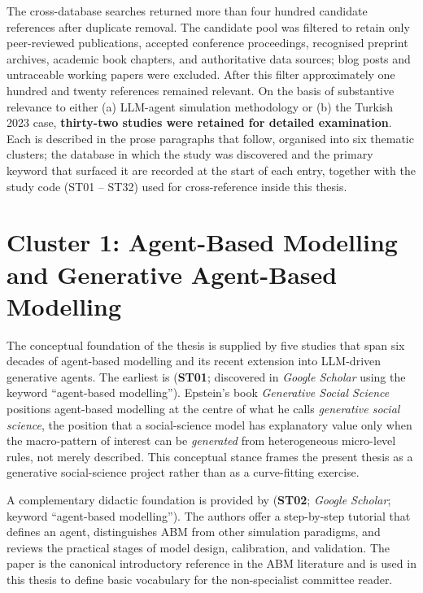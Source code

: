 \documentclass[12pt,a4paper]{report}
\begin{document}
The cross-database searches returned more than four hundred candidate references after duplicate removal. The candidate pool was filtered to retain only peer-reviewed publications, accepted conference proceedings, recognised preprint archives, academic book chapters, and authoritative data sources; blog posts and untraceable working papers were excluded. After this filter approximately one hundred and twenty references remained relevant. On the basis of substantive relevance to either (a) LLM-agent simulation methodology or (b) the Turkish 2023 case, \textbf{thirty-two studies were retained for detailed examination}. Each is described in the prose paragraphs that follow, organised into six thematic clusters; the database in which the study was discovered and the primary keyword that surfaced it are recorded at the start of each entry, together with the study code (ST01 -- ST32) used for cross-reference inside this thesis.

\section{Cluster 1: Agent-Based Modelling and Generative Agent-Based Modelling}
\label{sec:litcluster1}

The conceptual foundation of the thesis is supplied by five studies that span six decades of agent-based modelling and its recent extension into LLM-driven generative agents. The earliest is \citet{epstein2006generative} (\textbf{ST01}; discovered in \emph{Google Scholar} using the keyword \enquote{agent-based modelling}). Epstein's book \emph{Generative Social Science} positions agent-based modelling at the centre of what he calls \emph{generative social science}, the position that a social-science model has explanatory value only when the macro-pattern of interest can be \emph{generated} from heterogeneous micro-level rules, not merely described. This conceptual stance frames the present thesis as a generative social-science project rather than as a curve-fitting exercise.

A complementary didactic foundation is provided by \citet{macal2010tutorial} (\textbf{ST02}; \emph{Google Scholar}; keyword \enquote{agent-based modelling}). The authors offer a step-by-step tutorial that defines an agent, distinguishes ABM from other simulation paradigms, and reviews the practical stages of model design, calibration, and validation. The paper is the canonical introductory reference in the ABM literature and is used in this thesis to define basic vocabulary for the non-specialist committee reader.
\end{document}
